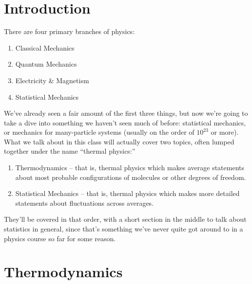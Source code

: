 \documentclass[a4paper]{article}
\begin{document}
\maketitle

\tableofcontents

\setcounter{section}{-1}
\section{Introduction}
There are four primary branches of physics:
\begin{enumerate}
	\item Classical Mechanics
	\item Quantum Mechanics
	\item Electricity \& Magnetism
	\item Statistical Mechanics
\end{enumerate}
We've already seen a fair amount of the first three things, but now we're going
to take a dive into something we haven't seen much of before: statistical
mechanics, or mechanics for many-particle systems (usually on the order of
$10^{23}$ or more).
What we talk about in this class will actually cover two topics,
often lumped together under the name ``thermal physics:''
\begin{enumerate}
	\item Thermodynamics -- that is, thermal physics which makes average
		statements about most probable configurations of
		molecules or other degrees of freedom.
	\item Statistical Mechanics -- that is, thermal physics which makes
		more detailed statements about fluctuations across averages.
\end{enumerate}
They'll be covered in that order, with a short section in the middle to talk
about statistics in general, since that's something we've never quite
got around to in a physics course so far for some reason.


\section{Thermodynamics}
\end{document}
